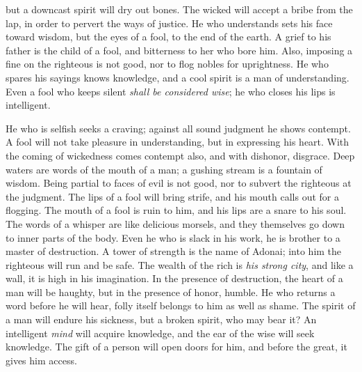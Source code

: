 \begin{biblechapter}
but a downcast spirit will dry out bones.
\verse The wicked will accept a bribe from the lap, 
in order to pervert the ways of justice.
\verse He who understands sets his face toward wisdom, 
but the eyes of a fool, to the end of the earth.
\verse A grief to his father is the child of a fool, 
and bitterness to her who bore him.
\verse Also, imposing a fine on the righteous is not good, 
nor to flog nobles for uprightness.
\verse He who spares his sayings knows knowledge, 
and a cool spirit is a man of understanding.
\verse Even a fool who keeps silent \textit{shall be considered wise}; 
he who closes his lips is intelligent.
\end{biblechapter}

\begin{biblechapter} %
\verse He who is selfish seeks a craving; 
against all sound judgment he shows contempt.
\verse A fool will not take pleasure in understanding, 
but in expressing his heart.
\verse With the coming of wickedness comes contempt also, 
and with dishonor, disgrace.
\verse Deep waters are words of the mouth of a man; 
a gushing stream is a fountain of wisdom.
\verse Being partial to faces of evil is not good, 
nor to subvert the righteous at the judgment.
\verse The lips of a fool will bring strife, 
and his mouth calls out for a flogging.
\verse The mouth of a fool is ruin to him, 
and his lips are a snare to his soul.
\verse The words of a whisper are like delicious morsels, 
and they themselves go down to inner parts of the body.
\verse Even he who is slack in his work, 
he is brother to a master of destruction.
\verse A tower of strength is the name of Adonai; 
into him the righteous will run and be safe.
\verse The wealth of the rich is \textit{his strong city}, 
and like a wall, it is high in his imagination.
\verse In the presence of destruction, the heart of a man will be haughty, 
but in the presence of honor, humble.
\verse He who returns a word before he will hear, 
folly itself belongs to him as well as shame.
\verse The spirit of a man will endure his sickness, 
but a broken spirit, who may bear it?
\verse An intelligent \textit{mind} will acquire knowledge, 
and the ear of the wise will seek knowledge.
\verse The gift of a person will open doors for him, 
and before the great, it gives him access.

\end{biblechapter}

